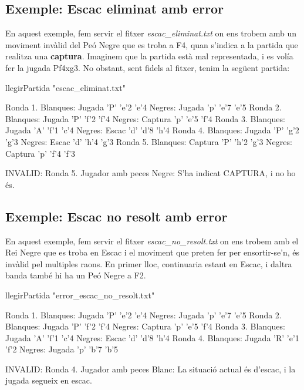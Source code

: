 \documentclass{article}
\begin{document}
\newpage
\subsection{Exemple: Escac eliminat \textbf{amb error}}

En aquest exemple, fem servir el fitxer \textit{escac\_eliminat.txt} on ens trobem amb un moviment invàlid del Peó Negre que es troba a F4, quan s'indica a la partida que realitza una \textbf{captura}. Imaginem que la partida està mal representada, i es volía fer la jugada Pf4xg3. No obstant, sent fidels al fitxer, tenim la següent partida:
\begin{tcolorbox}
llegirPartida "escac\_eliminat.txt"
\end{tcolorbox}
\begin{tcolorbox}
Ronda 1.
Blanques: Jugada 'P' 'e'2 'e'4
Negres:   Jugada 'p' 'e'7 'e'5
Ronda 2.
Blanques: Jugada 'P' 'f'2 'f'4
Negres:   Captura 'p' 'e'5 'f'4
Ronda 3.
Blanques: Jugada 'A' 'f'1 'c'4
Negres:   Escac 'd' 'd'8 'h'4
Ronda 4.
Blanques: Jugada 'P' 'g'2 'g'3
Negres:   Escac 'd' 'h'4 'g'3
Ronda 5.
Blanques: Captura 'P' 'h'2 'g'3
Negres:   Captura 'p' 'f'4 'f'3

INVALID: Ronda 5. Jugador amb peces Negre: S'ha indicat CAPTURA, i no ho és.
\end{tcolorbox}

\subsection{Exemple: Escac no resolt \textbf{amb error}}

En aquest exemple, fem servir el fitxer \textit{escac\_no\_resolt.txt} on ens trobem amb el Rei Negre que es troba en Escac i el moviment que preten fer per ensortir-se'n, és invàlid pel multiples raons. En primer lloc, continuaria estant en Escac, i daltra banda també hi ha un Peó Negre a F2.
\begin{tcolorbox}
llegirPartida "error\_escac\_no\_resolt.txt"
\end{tcolorbox}
\begin{tcolorbox}
Ronda 1.
Blanques: Jugada 'P' 'e'2 'e'4
Negres:   Jugada 'p' 'e'7 'e'5
Ronda 2.
Blanques: Jugada 'P' 'f'2 'f'4
Negres:   Captura 'p' 'e'5 'f'4
Ronda 3.
Blanques: Jugada 'A' 'f'1 'c'4
Negres:   Escac 'd' 'd'8 'h'4
Ronda 4.
Blanques: Jugada 'R' 'e'1 'f'2
Negres:   Jugada 'p' 'b'7 'b'5

INVALID: Ronda 4. Jugador amb peces Blanc: La situació actual és d'escac, i la jugada segueix en escac.
\end{tcolorbox}
\newpage
\end{document}
